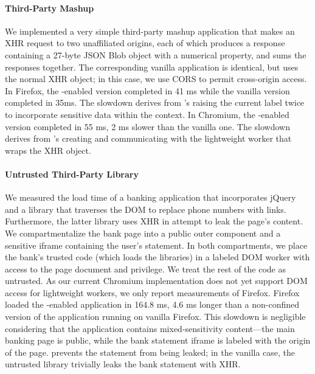 \paragraph{Third-Party Mashup}

We implemented a very simple third-party mashup application that makes
an XHR request to two unaffiliated origins, each of which produces a
response containing a 27-byte JSON Blob object with a numerical
property, and sums the responses together.
%
The corresponding vanilla application is identical, but uses the
normal XHR object; in this case, we use CORS to permit cross-origin
access.
%
In Firefox, the \sys{}-enabled version completed in 41 ms while the
vanilla version completed in 35ms. The slowdown derives from \sys{}'s
raising the current label twice to incorporate sensitive data within
the context.
%
In Chromium, the \sys{}-enabled version completed in 55 ms, 2 ms
slower than the vanilla one. The slowdown derives from \sys{}'s
creating and communicating with the lightweight worker that wraps the
XHR object.

\paragraph{Untrusted Third-Party Library}

We measured the load time of a banking application that incorporates
jQuery and a library that traverses the DOM to replace phone numbers
with links.
%
Furthermore, the latter library uses XHR in attempt to leak the page's
content.
%
We compartmentalize the bank page into a public outer component and a
sensitive iframe containing the user's statement. In both
compartments, we place the bank's trusted code (which loads the
libraries) in a labeled DOM worker with access to the page document
and privilege. We treat the rest of the code as untrusted.
%
As our current Chromium implementation does not yet support DOM access
for lightweight workers, we only report measurements of Firefox.
%
Firefox loaded the \sys{}-enabled application in 164.8 ms, 4.6 ms
longer than a non-confined version of the application running on
vanilla Firefox.
%
%
This slowdown is negligible considering that the application contains
mixed-sensitivity content---the main banking page is public, while the
bank statement iframe is labeled with the origin of the page. \sys{}
prevents the statement from being leaked; in the vanilla case, the
untrusted library trivially leaks the bank statement with XHR\@.





